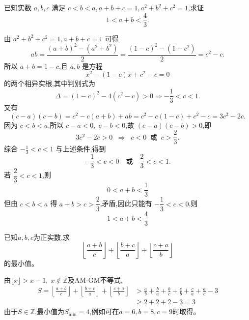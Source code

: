 \begin{questions}
    \question 已知实数 $a,b,c$ 满足 $c<b<a,a+b+c=1,a^2+b^2+c^2=1$,求证 
    \[
    1<a+b<\frac{4}{3}.
    \]
    \begin{solution}
        由 $a^2+b^2+c^2=1,a+b+c=1$ 可得
        \[
        ab = \frac{(a+b)^2-(a^2+b^2)}{2} 
        = \frac{(1-c)^2-(1-c^2)}{2} 
        = c^2-c.
        \]
        所以 $a+b=1-c$,且 $a,b$ 是方程
        \[
        x^2-(1-c)x+c^2-c=0
        \]
        的两个相异实根,其中判别式为
        \[
        \Delta=(1-c)^2-4(c^2-c) >0 \Rightarrow -\frac{1}{3}<c<1.
        \]
        又有
        \[
        (c-a)(c-b)=c^2-c(a+b)+ab
        = c^2-c(1-c)+c^2-c
        = 3c^2-2c.
        \]
        因为 $c<b<a$,所以 $c-a<0,\;c-b<0$,故 $(c-a)(c-b)>0$,即
        \[
        3c^2-2c>0 \;\;\Longrightarrow\;\; c<0 \;\; \text{或} \;\; c>\frac{2}{3}.
        \]
        综合 $-\frac{1}{3}<c<1$ 与上述条件,得到
        \[
        -\frac{1}{3}<c<0 \quad \text{或} \quad \frac{2}{3}<c<1.
        \]
        若 $\dfrac{2}{3}<c<1$,则
        \[
        0<a+b<\frac{1}{3}
        \]
        但由 $c<b<a$ 得 $a+b>c>\dfrac{2}{3}$,矛盾,因此只能有 $-\dfrac{1}{3}<c<0$,则
        \[
        1<a+b<\frac{4}{3}
        \]
    \end{solution}

    \question 已知$a,b,c$为正实数,求
    \[
    \left\lfloor \frac{a+b}{c} \right\rfloor + \left\lfloor \frac{b+c}{a} \right\rfloor + \left\lfloor \frac{c+a}{b} \right\rfloor
    \]
    的最小值。
    \begin{solution}
        由$\lfloor x\rfloor > x-1,\;x \notin \mathbb{Z}$及AM-GM不等式,
        \begin{align*}
        S=\left\lfloor \frac{a+b}{c} \right\rfloor + \left\lfloor \frac{b+c}{a} \right\rfloor + \left\lfloor \frac{c+a}{b} \right\rfloor &> \frac{a}{b} + \frac{b}{a} + \frac{b}{c} + \frac{c}{b} + \frac{c}{a} + \frac{a}{c}-3 \\
        &\ge 2+2+2-3 =3
        \end{align*}
        由于$S \in \mathbb{Z}$,最小值为$S_{\min}=4$,例如可在$a=6,b=8,c=9$时取得。
    \end{solution}


\end{questions}
